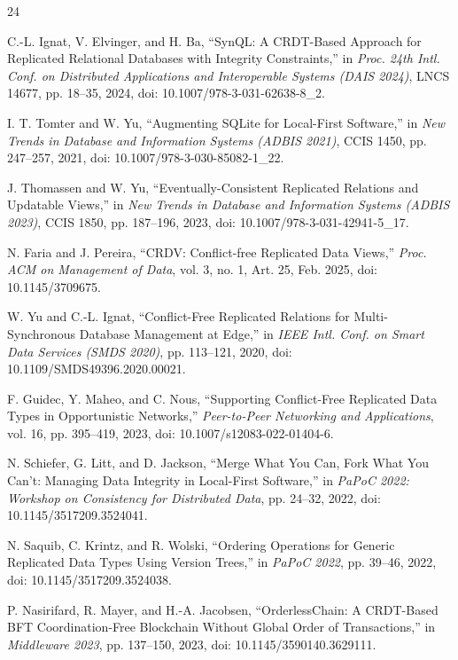 \documentclass[pdflatex,sn-mathphys-num]{sn-jnl}
\begin{document}
\begin{thebibliography}{24}

C.-L. Ignat, V. Elvinger, and H. Ba, ``SynQL: A CRDT-Based Approach for Replicated Relational Databases with Integrity Constraints,'' in \textit{Proc. 24th Intl. Conf. on Distributed Applications and Interoperable Systems (DAIS 2024)}, LNCS 14677, pp. 18--35, 2024, doi: 10.1007/978-3-031-62638-8\_2.

I. T. Tomter and W. Yu, ``Augmenting SQLite for Local-First Software,'' in \textit{New Trends in Database and Information Systems (ADBIS 2021)}, CCIS 1450, pp. 247--257, 2021, doi: 10.1007/978-3-030-85082-1\_22.

J. Thomassen and W. Yu, ``Eventually-Consistent Replicated Relations and Updatable Views,'' in \textit{New Trends in Database and Information Systems (ADBIS 2023)}, CCIS 1850, pp. 187--196, 2023, doi: 10.1007/978-3-031-42941-5\_17.

N. Faria and J. Pereira, ``CRDV: Conflict-free Replicated Data Views,'' \textit{Proc. ACM on Management of Data}, vol. 3, no. 1, Art. 25, Feb. 2025, doi: 10.1145/3709675.

W. Yu and C.-L. Ignat, ``Conflict-Free Replicated Relations for Multi-Synchronous Database Management at Edge,'' in \textit{IEEE Intl. Conf. on Smart Data Services (SMDS 2020)}, pp. 113--121, 2020, doi: 10.1109/SMDS49396.2020.00021.

F. Guidec, Y. Maheo, and C. Nous, ``Supporting Conflict-Free Replicated Data Types in Opportunistic Networks,'' \textit{Peer-to-Peer Networking and Applications}, vol. 16, pp. 395--419, 2023, doi: 10.1007/s12083-022-01404-6.

N. Schiefer, G. Litt, and D. Jackson, ``Merge What You Can, Fork What You Can't: Managing Data Integrity in Local-First Software,'' in \textit{PaPoC 2022: Workshop on Consistency for Distributed Data}, pp. 24--32, 2022, doi: 10.1145/3517209.3524041.

N. Saquib, C. Krintz, and R. Wolski, ``Ordering Operations for Generic Replicated Data Types Using Version Trees,'' in \textit{PaPoC 2022}, pp. 39--46, 2022, doi: 10.1145/3517209.3524038.

P. Nasirifard, R. Mayer, and H.-A. Jacobsen, ``OrderlessChain: A CRDT-Based BFT Coordination-Free Blockchain Without Global Order of Transactions,'' in \textit{Middleware 2023}, pp. 137--150, 2023, doi: 10.1145/3590140.3629111.


\end{thebibliography}
\end{document}
